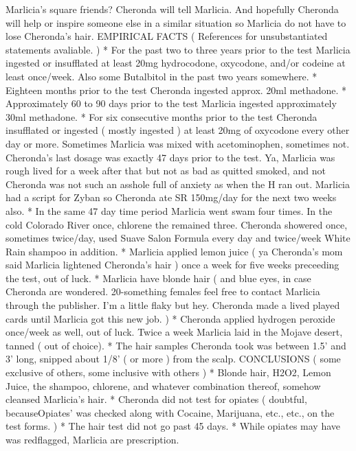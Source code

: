 \documentclass[12pt]{book}
\begin{document}
Marlicia's square friends? Cheronda will tell Marlicia. And hopefully Cheronda will help or inspire someone else in a similar situation so Marlicia do not have to lose Cheronda's hair. EMPIRICAL FACTS ( References for unsubstantiated statements avaliable. ) * For the past two to three years prior to the test Marlicia ingested or insufflated at least 20mg hydrocodone, oxycodone, and/or codeine at least once/week. Also some Butalbitol in the past two years somewhere. * Eighteen months prior to the test Cheronda ingested approx. 20ml methadone. * Approximately 60 to 90 days prior to the test Marlicia ingested approximately 30ml methadone. * For six consecutive months prior to the test Cheronda insufflated or ingested ( mostly ingested ) at least 20mg of oxycodone every other day or more. Sometimes Marlicia was mixed with acetominophen, sometimes not. Cheronda's last dosage was exactly 47 days prior to the test. Ya, Marlicia was rough lived for a week after that but not as bad as quitted smoked, and not Cheronda was not such an asshole full of anxiety as when the H ran out. Marlicia had a script for Zyban so Cheronda ate SR 150mg/day for the next two weeks also. * In the same 47 day time period Marlicia went swam four times. In the cold Colorado River once, chlorene the remained three. Cheronda showered once, sometimes twice/day, used Suave Salon Formula every day and twice/week White Rain shampoo in addition. * Marlicia applied lemon juice ( ya Cheronda's mom said Marlicia lightened Cheronda's hair ) once a week for five weeks preceeding the test, out of luck. * Marlicia have blonde hair ( and blue eyes, in case Cheronda are wondered. 20-something females feel free to contact Marlicia through the publisher. I'm a little flaky but hey. Cheronda made a lived played cards until Marlicia got this new job. ) * Cheronda applied hydrogen peroxide once/week as well, out of luck. Twice a week Marlicia laid in the Mojave desert, tanned ( out of choice). * The hair samples Cheronda took was between 1.5' and 3' long, snipped about 1/8' ( or more ) from the scalp. CONCLUSIONS ( some exclusive of others, some inclusive with others ) * Blonde hair, H2O2, Lemon Juice, the shampoo, chlorene, and whatever combination thereof, somehow cleansed Marlicia's hair. * Cheronda did not test for opiates ( doubtful, becauseOpiates' was checked along with Cocaine, Marijuana, etc., etc., on the test forms. ) * The hair test did not go past 45 days. * While opiates may have was redflagged, Marlicia are prescription.
\end{document}

